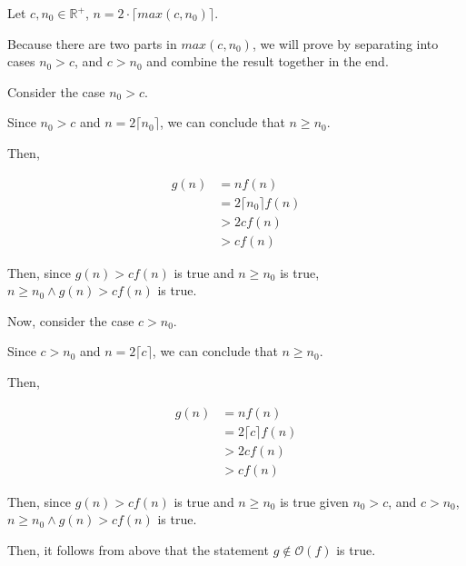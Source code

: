 \documentclass[12pt]{article}
\begin{document}
\begin{enumerate}[a.]
    \bigskip

    Let $c,n_0 \in \mathbb{R}^{+}$, $n = 2 \cdot \lceil max(c,n_0) \rceil$.

    \bigskip

    Because there are two parts in $max(c,n_0)$, we will prove by separating into
    cases $n_0 > c$, and $c > n_0$ and combine the result together in the end.

    \bigskip

    Consider the case $n_0 > c$.

    \bigskip

    Since $n_0 > c$ and $n = 2\lceil n_0 \rceil$, we can conclude that
    $n \geq n_0$.

    \bigskip

    Then,

    \setcounter{equation}{0}
    \begin{align}
        g(n) &= nf(n)\\
        &= 2\lceil n_0 \rceil f(n)\\
        &> 2cf(n)\\
        &> cf(n)
    \end{align}

    \bigskip

    Then, since $g(n) > cf(n)$ is true and $n \geq n_0$ is true, $n \geq n_0 \land
    g(n) > cf(n)$ is true.

    \bigskip

    Now, consider the case $c > n_0$.

    \bigskip

    Since $c > n_0$ and $n = 2\lceil c \rceil$, we can conclude that
    $n \geq n_0$.

    \bigskip

    Then,

    \begin{align}
        g(n) &= nf(n)\\
        &= 2\lceil c \rceil f(n)\\
        &> 2cf(n)\\
        &> cf(n)
    \end{align}

    \bigskip

    Then, since $g(n) > cf(n)$ is true and $n \geq n_0$ is true given $n_0 > c$,
    and $c > n_0$, $n \geq n_0 \land g(n) > cf(n)$ is true.

    \bigskip

    Then, it follows from above that the statement $g \notin \mathcal{O}(f)$ is
    true.


\end{enumerate}
\end{document}
